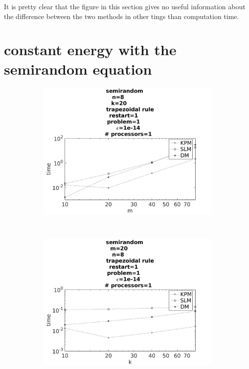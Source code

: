 It is pretty clear that the figure in this section gives no useful information about the difference between the two methods in other tings than computation time.



\section{constant energy with the semirandom equation}



\begin{figure}[H]
        \centering
        \begin{subfigure}[b]{0.45\textwidth}
                \includegraphics[width=\textwidth]{../MATLAB/fig/sresulttimem.jpg}
                \caption{  }
                \label{fig:sresulttimem}
        \end{subfigure}
        ~
        \begin{subfigure}[b]{0.45\textwidth}
                \includegraphics[width=\textwidth]{../MATLAB/fig/sresulttimek.jpg}

\end{subfigure}
\end{figure}

